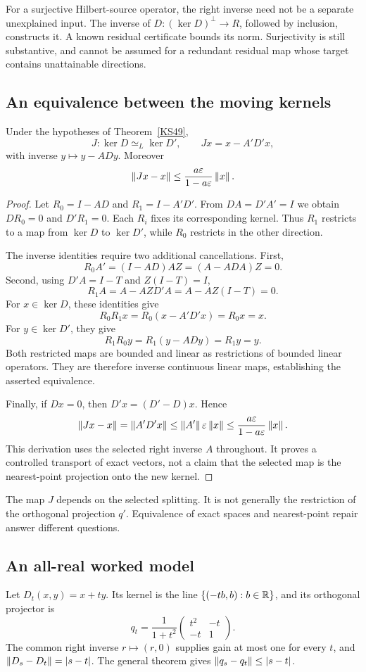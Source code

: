 For a surjective Hilbert-source operator, the right inverse need not be a separate unexplained input. The inverse of \(D:(\ker D)^\perp\to R\), followed by inclusion, constructs it. A known residual certificate bounds its norm. Surjectivity is still substantive, and cannot be assumed for a redundant residual map whose target contains unattainable directions.

\subsection{An equivalence between the moving kernels}
\begin{theorem}\label{KS50}
Under the hypotheses of Theorem~\ref{KS49},
\[
 J:\ker D\simeq_L\ker D',\qquad Jx=x-A'D'x,
\]
with inverse \(y\mapsto y-ADy\). Moreover
\[
 \left\lVert Jx-x\right\rVert\le\frac{a\varepsilon}{1-a\varepsilon}\left\lVert x\right\rVert.
\]
\end{theorem}
\begin{proof}
Let $R_0=I-AD$ and $R_1=I-A'D'$. From $DA=D'A'=I$ we obtain $DR_0=0$ and $D'R_1=0$. Each $R_i$ fixes its corresponding kernel. Thus $R_1$ restricts to a map from $\ker D$ to $\ker D'$, while $R_0$ restricts in the other direction.

The inverse identities require two additional cancellations. First,
\[
 R_0A'=(I-AD)AZ=(A-ADA)Z=0.
\]
Second, using $D'A=I-T$ and $Z(I-T)=I$,
\[
 R_1A=A-AZD'A=A-AZ(I-T)=0.
\]
For $x\in\ker D$, these identities give
\[
 R_0R_1x=R_0(x-A'D'x)=R_0x=x.
\]
For $y\in\ker D'$, they give
\[
 R_1R_0y=R_1(y-ADy)=R_1y=y.
\]
Both restricted maps are bounded and linear as restrictions of bounded linear operators. They are therefore inverse continuous linear maps, establishing the asserted equivalence.

Finally, if $Dx=0$, then $D'x=(D'-D)x$. Hence
\[
 \left\lVert Jx-x\right\rVert=\left\lVert A'D'x\right\rVert
 \le\left\lVert A'\right\rVert\varepsilon\left\lVert x\right\rVert
 \le\frac{a\varepsilon}{1-a\varepsilon}\left\lVert x\right\rVert.
\]
This derivation uses the selected right inverse $A$ throughout. It proves a controlled transport of exact vectors, not a claim that the selected map is the nearest-point projection onto the new kernel.
\end{proof}
The map \(J\) depends on the selected splitting. It is not generally the restriction of the orthogonal projection \(q'\). Equivalence of exact spaces and nearest-point repair answer different questions.

\subsection{An all-real worked model}
Let \(D_t(x,y)=x+ty\). Its kernel is the line \(\{(-tb,b):b\in\mathbb R\}\), and its orthogonal projector is
\begin{equation}\label{eq:lineprojector}
 q_t=\frac1{1+t^2}
 \begin{pmatrix}t^2&-t\\-t&1\end{pmatrix}.
\end{equation}
The common right inverse \(r\mapsto(r,0)\) supplies gain at most one for every \(t\), and \(\left\lVert D_s-D_t\right\rVert=|s-t|\). The general theorem gives \(\left\lVert q_s-q_t\right\rVert\le|s-t|\).

